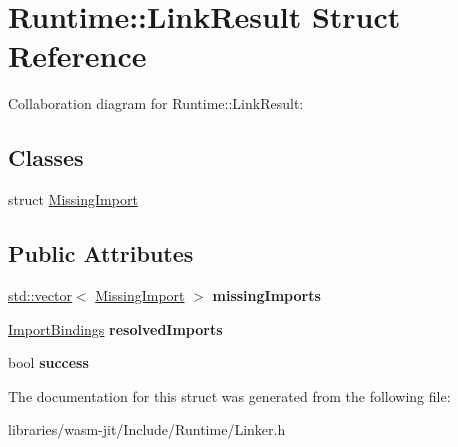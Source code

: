 \hypertarget{struct_runtime_1_1_link_result}{}\section{Runtime\+:\+:Link\+Result Struct Reference}
\label{struct_runtime_1_1_link_result}


Collaboration diagram for Runtime\+:\+:Link\+Result\+:
\subsection*{Classes}
\begin{DoxyCompactItemize}
\item 
struct \mbox{\hyperlink{struct_runtime_1_1_link_result_1_1_missing_import}{Missing\+Import}}
\end{DoxyCompactItemize}
\subsection*{Public Attributes}
\begin{DoxyCompactItemize}
\item 
\mbox{\label{struct_runtime_1_1_link_result_a1536a51a79ba5e395fd5e7fb5dbebc2d}} 
\mbox{\hyperlink{classstd_1_1vector}{std\+::vector}}$<$ \mbox{\hyperlink{struct_runtime_1_1_link_result_1_1_missing_import}{Missing\+Import}} $>$ {\bfseries missing\+Imports}
\item 
\mbox{\label{struct_runtime_1_1_link_result_adcdc7055d36a907b85059c418b0ba498}} 
\mbox{\hyperlink{struct_runtime_1_1_import_bindings}{Import\+Bindings}} {\bfseries resolved\+Imports}
\item 
\mbox{\label{struct_runtime_1_1_link_result_aaa99197bc06bcff6f0f29a57d4ea33bc}} 
bool {\bfseries success}
\end{DoxyCompactItemize}


The documentation for this struct was generated from the following file\+:\begin{DoxyCompactItemize}
\item 
libraries/wasm-\/jit/\+Include/\+Runtime/Linker.\+h\end{DoxyCompactItemize}

